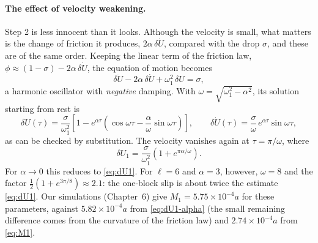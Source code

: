 \paragraph{The effect of velocity weakening.} Step 2 is less innocent than it looks. Although the velocity is small, what matters
is the change of friction it produces, $2\alpha\,\delta\dot U$, compared with the drop $\sigma$, and these are of the same order. Keeping
the linear term of the friction law, $\phi\approx(1-\sigma)-2\alpha\,\delta\dot U$, the equation of motion becomes
\begin{equation}
  \delta\ddot U - 2\alpha\,\delta\dot U + \omega_1^2\,\delta U = \sigma ,
\end{equation}
a harmonic oscillator with \emph{negative} damping. With $\omega = \sqrt{\omega_1^2-\alpha^2}$, its solution starting from rest is
\begin{equation}
  \delta U(\tau) = \frac{\sigma}{\omega_1^2}\left[1 - e^{\alpha\tau}\left(\cos\omega\tau - \frac{\alpha}{\omega}\sin\omega\tau\right)\right],
  \qquad
  \delta\dot U(\tau) = \frac{\sigma}{\omega}\,e^{\alpha\tau}\sin\omega\tau ,
\end{equation}
as can be checked by substitution. The velocity vanishes again at $\tau = \pi/\omega$, where
\begin{equation}
  \delta U_1 = \frac{\sigma}{\omega_1^2}\left(1 + e^{\pi\alpha/\omega}\right).
  \label{eq:dU1-alpha}
\end{equation}
For $\alpha\to0$ this reduces to \cref{eq:dU1}. For $\ell=6$ and $\alpha=3$, however, $\omega = 8$ and the factor
$\tfrac12(1+e^{3\pi/8})\approx2.1$: the one-block slip is about twice the estimate \cref{eq:dU1}. Our simulations (Chapter~6) give
$M_1 = 5.75\times10^{-4}a$ for these parameters, against $5.82\times10^{-4}a$ from \cref{eq:dU1-alpha} (the small remaining difference
comes from the curvature of the friction law) and $2.74\times10^{-4}a$ from \cref{eq:M1}.


